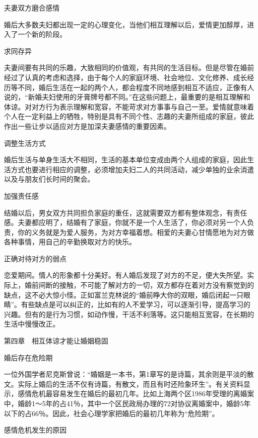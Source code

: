 \documentclass[12pt,UTF8]{ctexbook}
\begin{document}
夫妻双方磨合感情


婚后大多数夫妇都出现一定的心理变化，当他们相互理解以后，爱情更加醇厚，进入了一个新的阶段。

求同存异

夫妻间要有共同的乐趣，大致相同的价值观，有共同的生活目标。但是尽管在婚前经过了认真的考虑和选择，由于每个人的家庭环境、社会地位、文化修养、成长经历等不同，婚后生活在一起的两个人，都会程度不同地感到相互不适应，正像有人说的，“新婚夫妇使用的牙膏牌号都不同。”在这些问题上，最重要的是相互理解和体谅。对对方行为表示理解和宽容，不能苛求对方事事与自己一至。爱情就意味着个人在一定利益上的牺牲，特别是具有不同个性、志趣的夫妻所组成的家庭，彼此作出一些让步以适应对方是加深夫妻感情的重要因素。

调整生活方式

婚后生活与单身生活大不相同，生活的基本单位变成由两个人组成的家庭，因此生活方式也要进行相应的调整，必须增加夫妇二人的共同活动，减少单独的业余消遣以及与朋友们长时间的聚会。

加强责任感

结婚以后，男女双方共同担负家庭的重任，这就需要双方都有整体观念，有责任感。夫妻都应明了，结婚有了家庭，你就不是一个人生活了，你必须对另一个人负责，你的义务就是为爱人服务，为对方幸福着想。相爱的夫妻心甘情愿地为对方做各种事情，用自己的辛勤换取对方的快乐。

正确对待对方的弱点

恋爱期间。情人的形象都十分美好。有人婚后发现了对方的不足，便大失所望。实际上，婚前间断的接触，不可能了解对方的一切，双方都存在着对方没有察觉到的缺点，这不必大惊小怪。正如富兰克林说的“婚前睁大你的双眼，婚后闭起一只眼睛”。有些缺点是可以纠正的，比如有的人不爱学习，可以逐渐引导，提高学习的兴趣。但有的是行为习惯，如动作慢，干活不利落等。这只能相互宽容，在长期的生活中慢慢改正。





第四章　相互体谅才能让婚姻稳固


婚后存在危险期


一位外国学者尼克斯曾说：“婚姻是一本书，第1章写的是诗篇，其余则是平淡的散文。实际上婚后的生活不仅有诗篇，有散文，而且有时还险象环生”。有关资料显示，感情危机最容易发生在婚后的最初几年。比如上海两个区1986年受理的离婚案中，婚龄1～5年的占41％，其中一个区民政局办理的72对协议离婚案中，婚龄5年以下的占66％。因此，社会心理学家把婚后的最初几年称为“危险期”。





感情危机发生的原因
\end{document}
